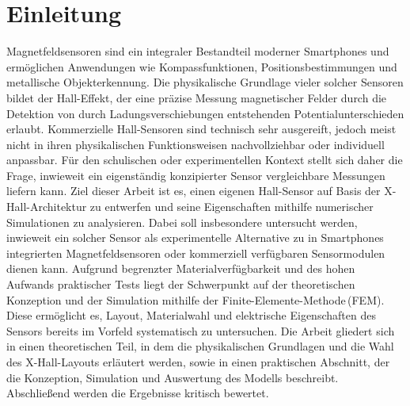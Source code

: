 \documentclass[12pt, a4paper]{article}
\begin{document}
\begin{abstract}
	In dieser Arbeit werden die Konzeption und Simulation eines Hall-Sensors auf Basis der X-Hall-Architektur vorgestellt. Ziel ist die Erfassung magnetischer Flussdichten und die Untersuchung, ob der Sensor als experimentelle Alternative zu in Smartphones integrierten oder externen Magnetfeldsensoren geeignet ist. Mithilfe der Finite-Elemente-Methode\,(FEM) wurde das elektrische Verhalten des Sensors in einer Computersimulation analysiert und die Auswirkungen von Geometrie, Materialwahl und Gestaltung der Kontakte untersucht. Die Simulationsergebnisse zeigen, dass der entworfene Sensor prinzipiell funktionsfähig sein sollte und eine Grundlage für zukünftige Optimierungen bietet. Neben den technischen Ergebnissen unterstreicht die Arbeit den didaktischen Wert eines eigenständig entwickelten Sensors im schulischen oder experimentellen Kontext, da der Entwicklungsprozess sowohl ein tieferes Verständnis physikalischer Grundlagen als auch Kompetenzen im wissenschaftlichen Arbeiten und in der computergestützten Modellierung physikalischer Probleme fördert.
\end{abstract}


\section{Einleitung}
Magnetfeldsensoren sind ein integraler Bestandteil moderner Smartphones und ermöglichen Anwendungen wie Kompassfunktionen, Positionsbestimmungen und metallische Objekterkennung. Die physikalische Grundlage vieler solcher Sensoren bildet der Hall-Effekt, der eine präzise Messung magnetischer Felder durch die Detektion von durch Ladungsverschiebungen entstehenden Potentialunterschieden erlaubt.\newline
Kommerzielle Hall-Sensoren sind technisch sehr ausgereift, jedoch meist nicht in ihren physikalischen Funktionsweisen nachvollziehbar oder individuell anpassbar. Für den schulischen oder experimentellen Kontext stellt sich daher die Frage, inwieweit ein eigenständig konzipierter Sensor vergleichbare Messungen liefern kann.\newline
Ziel dieser Arbeit ist es, einen eigenen Hall-Sensor auf Basis der X-Hall-Architektur zu entwerfen und seine Eigenschaften mithilfe numerischer Simulationen zu analysieren. Dabei soll insbesondere untersucht werden, inwieweit ein solcher Sensor als experimentelle Alternative zu in Smartphones integrierten Magnetfeldsensoren oder kommerziell verfügbaren Sensormodulen dienen kann.\newline
Aufgrund begrenzter Materialverfügbarkeit und des hohen Aufwands praktischer Tests liegt der Schwerpunkt auf der theoretischen Konzeption und der Simulation mithilfe der Finite-Elemente-Methode\,(FEM). Diese ermöglicht es, Layout, Materialwahl und elektrische Eigenschaften des Sensors bereits im Vorfeld systematisch zu untersuchen.\newline
Die Arbeit gliedert sich in einen theoretischen Teil, in dem die physikalischen Grundlagen und die Wahl des X-Hall-Layouts erläutert werden, sowie in einen praktischen Abschnitt, der die Konzeption, Simulation und Auswertung des Modells beschreibt. Abschließend werden die Ergebnisse kritisch bewertet.
\end{document}
